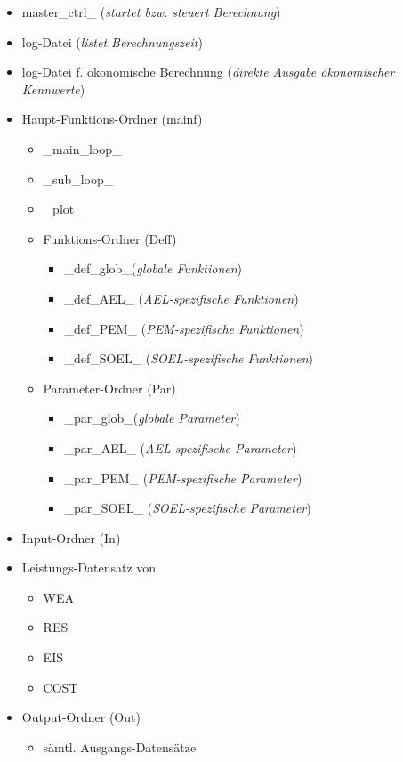 \documentclass[onecolumn,10pt,titlepage]{article}
\begin{document}
\begin{itemize}
	\item master\_ctrl\_ (\textit{startet bzw. steuert Berechnung})
	\item log-Datei (\textit{listet Berechnungszeit})
	\item log-Datei f. ökonomische Berechnung (\textit{direkte Ausgabe ökonomischer Kennwerte})
	\item Haupt-Funktions-Ordner (mainf)
	\begin{itemize}
		\item \_main\_loop\_
		\item \_sub\_loop\_
		\item \_plot\_
		\item Funktions-Ordner (Deff)
		\begin{itemize}
			\item \_def\_glob\_(\textit{globale Funktionen})
			\item \_def\_AEL\_ (\textit{AEL-spezifische Funktionen})
			\item \_def\_PEM\_ (\textit{PEM-spezifische Funktionen})
			\item \_def\_SOEL\_ (\textit{SOEL-spezifische Funktionen})
		\end{itemize}
		\item Parameter-Ordner (Par)
		\begin{itemize}
			\item \_par\_glob\_(\textit{globale Parameter})
			\item \_par\_AEL\_ (\textit{AEL-spezifische Parameter})
			\item \_par\_PEM\_ (\textit{PEM-spezifische Parameter})
			\item \_par\_SOEL\_ (\textit{SOEL-spezifische Parameter})
		\end{itemize}
	\end{itemize}
	\item Input-Ordner (In)
	\item[] Leistungs-Datensatz von
	\begin{itemize}
		\item WEA
		\item RES
		\item EIS
		\item COST
	\end{itemize}
	\item Output-Ordner (Out)
	\begin{itemize}
		\item sämtl. Ausgangs-Datensätze
	\end{itemize}

\end{itemize}
\end{document}
